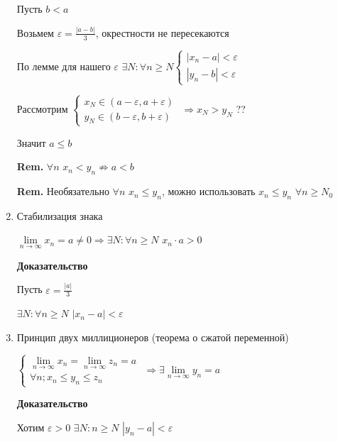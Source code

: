 \documentclass[14pt, letter paper]{article}
\begin{document}
\begin{enumerate}
    Пусть $b < a$

    Возьмем $\varepsilon = \frac{|a-b|}{3}$, окрестности не пересекаются

    По лемме для нашего $\varepsilon$ $\exists N:\forall n \geq N \begin{cases}
        |x_n - a| < \varepsilon \\
        |y_n - b| < \varepsilon
    \end{cases}$

    Рассмотрим $\begin{cases}
        x_N \in (a - \varepsilon, a + \varepsilon) \\
        y_N \in (b - \varepsilon, b + \varepsilon)
    \end{cases}$
    $\Rightarrow x_N > y_N$ ??

    Значит $a \leq b$

    \textbf{Rem.} $\forall n$ $x_n < y_n \not\Rightarrow a < b$

    \textbf{Rem.} Необязательно $\forall n$ $x_n \leq y_n$, можно использовать $x_n \leq y_n$ $\forall n \geq N_0$

    \item Стабилизация знака

    $\lim\limits_{n \rightarrow \infty}{x_n} = a \neq 0 \Rightarrow \exists N : \forall n \geq N$ $x_n \cdot a > 0$

    \begin{center}
        \textbf{Доказательство}
    \end{center}

    Пусть $\varepsilon = \frac{|a|}{3}$

    $\exists N : \forall n \geq N$ $|x_n - a| < \varepsilon$

    \item Принцип двух миллиционеров (теорема о сжатой переменной)

    $\begin{cases}
        \lim\limits_{n \rightarrow \infty}{x_n} = \lim\limits_{n \rightarrow \infty}{z_n} = a \\
        \forall n; x_n \leq y_n \leq z_n
    \end{cases}$
    $\Rightarrow \exists \lim\limits_{n \rightarrow \infty}{y_n} = a$

    \begin{center}
        \textbf{Доказательство}
    \end{center}

    Хотим $\varepsilon > 0$ $\exists N : n \geq N$ $|y_n - a| < \varepsilon$


\end{enumerate}
\end{document}
